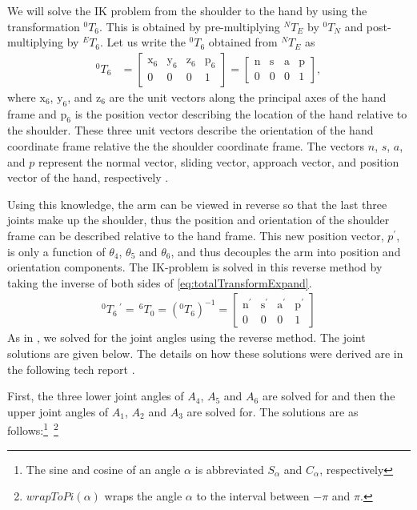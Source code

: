 \documentclass[letterpaper, 10 pt, conference]{IEEEtran}
\begin{document}
We will solve the IK problem from the shoulder to the hand by using the transformation $^0T_6$. This is obtained by pre-multiplying $^NT_E$ by $^0T_N$ and post-multiplying by $^ET_6$. Let us write the $^0T_6$ obtained from $^NT_E$ as
\begin{align} \label{eq:totalTransformExpand}
^0T_6 &= \begin{bmatrix}
	\mathrm{x}_6 & \mathrm{y}_6 & \mathrm{z}_6 & \mathrm{p}_6 \\
	0   & 0   & 0   & 1
\end{bmatrix}
= \begin{bmatrix}
	\mathrm{n} & \mathrm{s} & \mathrm{a} & \mathrm{p} \\
	0 & 0 & 0 & 1
\end{bmatrix},
\end{align}
where $\textrm{x}_6$, $\textrm{y}_6$, and $\textrm{z}_6$ are the unit vectors along the principal axes of the hand frame and $\textrm{p}_6$ is the position vector describing the location of the hand relative to the shoulder. These three unit vectors describe the orientation of the hand coordinate frame relative the the shoulder coordinate frame. The vectors $n$, $s$, $a$, and $p$ represent the normal vector, sliding vector, approach vector, and position vector of the hand, respectively \cite{Fu:1987uu}.

Using this knowledge, the arm can be viewed in reverse so that the last three joints make up the shoulder, thus the position and orientation of the shoulder frame can be described relative to the hand frame. This new position vector, $p^\prime$, is only a function of $\theta_4$, $\theta_5$ and $\theta_6$, and thus decouples the arm into position and orientation components. The IK-problem is solved in this reverse method by taking the inverse of both sides of \eqref{eq:totalTransformExpand}.
\begin{align}\label{eq:inverseTotalTransform}
^0T_6\,^\prime = \,^6T_0 = (^0T_6)^{-1} = 
	\begin{bmatrix}
    	\mathrm{n^\prime} & \mathrm{s^\prime} & \mathrm{a^\prime} & \mathrm{p^\prime} \\
    	0 & 0 & 0 & 1
	\end{bmatrix}
\end{align}
As in \cite{Ali:2010wm}, we solved for the joint angles using the reverse method. The joint solutions are given below. The details on how these solutions were derived are in the following tech report \cite{O'Flaherty:2013inverseIK}.

First, the three lower joint angles of $A_4$, $A_5$ and $A_6$ are solved for and then the upper joint angles of $A_1$, $A_2$ and $A_3$ are solved for. The solutions are as follows:\footnote{The sine and cosine of an angle $\alpha$ is abbreviated $S_\alpha$ and $C_\alpha$, respectively}~\footnote{$wrapToPi(\alpha)$ wraps the angle $\alpha$ to the interval between $-\pi$ and $\pi$.}
\end{document}
